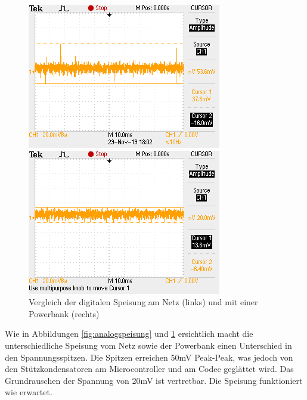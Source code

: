 \begin{figure} [H]
\begin{minipage}[c]{0.45\textwidth}
\includegraphics[width=\textwidth]{graphics/Speisung_Netz_Digital.png}
\end{minipage}
\begin{minipage}[c]{0.45\textwidth}
\includegraphics[width=\textwidth]{graphics/Speisung_PB_Digital.png}
\end{minipage}
\caption{Vergleich der digitalen Speisung am Netz (links) und mit einer Powerbank (rechts)}
\label{fig:digitalspeisung}
\end{figure} 

Wie in Abbildungen \ref{fig:analogspeisung} und \ref{fig:digitalspeisung} ersichtlich macht die unterschiedliche Speisung vom Netz sowie der Powerbank einen Unterschied in den Spannungsspitzen. Die Spitzen erreichen 50mV Peak-Peak, was jedoch von den Stützkondensatoren am Microcontroller und am Codec geglättet wird. Das Grundrauschen der Spannung von 20mV ist vertretbar. Die Speisung funktioniert wie erwartet.

